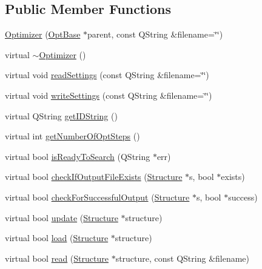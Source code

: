 \subsection*{Public Member Functions}
\begin{DoxyCompactItemize}
\item 
\hyperlink{classGlobalSearch_1_1Optimizer_a8c5a3335ff76f8a6a21a160d0139d842}{Optimizer} (\hyperlink{classGlobalSearch_1_1OptBase}{Opt\-Base} $\ast$parent, const Q\-String \&filename=\char`\"{}\char`\"{})
\item 
virtual \hyperlink{classGlobalSearch_1_1Optimizer_ace719aed9bbba0b3a568513ff68f8067}{$\sim$\-Optimizer} ()
\item 
virtual void \hyperlink{classGlobalSearch_1_1Optimizer_afef2dc22aa09df5e50e2f7b4f492091a}{read\-Settings} (const Q\-String \&filename=\char`\"{}\char`\"{})
\item 
virtual void \hyperlink{classGlobalSearch_1_1Optimizer_af67c36d87d7b41b1e91773b519d77829}{write\-Settings} (const Q\-String \&filename=\char`\"{}\char`\"{})
\item 
virtual Q\-String \hyperlink{classGlobalSearch_1_1Optimizer_aa81df016b0c8f3055a5e9e917eaefc75}{get\-I\-D\-String} ()
\item 
virtual int \hyperlink{classGlobalSearch_1_1Optimizer_aeeb18e38fa60535f74b577591400dd60}{get\-Number\-Of\-Opt\-Steps} ()
\item 
virtual bool \hyperlink{classGlobalSearch_1_1Optimizer_a10d37164307814e91c55bf846a59a80b}{is\-Ready\-To\-Search} (Q\-String $\ast$err)
\item 
virtual bool \hyperlink{classGlobalSearch_1_1Optimizer_afb5058a5e6a94e49c249284401680d5f}{check\-If\-Output\-File\-Exists} (\hyperlink{classGlobalSearch_1_1Structure}{Structure} $\ast$s, bool $\ast$exists)
\item 
virtual bool \hyperlink{classGlobalSearch_1_1Optimizer_a8d9373ded1b851ae6fdcbff41ed911cf}{check\-For\-Successful\-Output} (\hyperlink{classGlobalSearch_1_1Structure}{Structure} $\ast$s, bool $\ast$success)
\item 
virtual bool \hyperlink{classGlobalSearch_1_1Optimizer_a7e57844e4e6d713c87e6cf29ea03c5e2}{update} (\hyperlink{classGlobalSearch_1_1Structure}{Structure} $\ast$structure)
\item 
virtual bool \hyperlink{classGlobalSearch_1_1Optimizer_a5a2c5bc75be24ee41c27c1a2fe0e446a}{load} (\hyperlink{classGlobalSearch_1_1Structure}{Structure} $\ast$structure)
\item 
virtual bool \hyperlink{classGlobalSearch_1_1Optimizer_a671035cb8c0afbb4a1755b395bd063bd}{read} (\hyperlink{classGlobalSearch_1_1Structure}{Structure} $\ast$structure, const Q\-String \&filename)

\end{DoxyCompactItemize}
